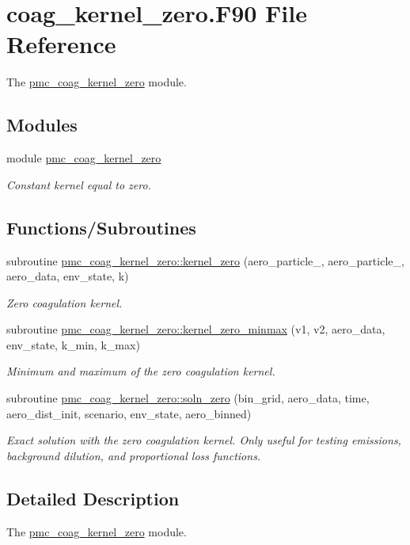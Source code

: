 \hypertarget{coag__kernel__zero_8_f90}{}\section{coag\+\_\+kernel\+\_\+zero.\+F90 File Reference}
\label{coag__kernel__zero_8_f90}


The \mbox{\hyperlink{namespacepmc__coag__kernel__zero}{pmc\+\_\+coag\+\_\+kernel\+\_\+zero}} module.  


\subsection*{Modules}
\begin{DoxyCompactItemize}
\item 
module \mbox{\hyperlink{namespacepmc__coag__kernel__zero}{pmc\+\_\+coag\+\_\+kernel\+\_\+zero}}
\begin{DoxyCompactList}\small\item\em Constant kernel equal to zero. \end{DoxyCompactList}\end{DoxyCompactItemize}
\subsection*{Functions/\+Subroutines}
\begin{DoxyCompactItemize}
\item 
subroutine \mbox{\hyperlink{namespacepmc__coag__kernel__zero_ac45443a66ef9e7a0dd042ca4e6d2b66d}{pmc\+\_\+coag\+\_\+kernel\+\_\+zero\+::kernel\+\_\+zero}} (aero\+\_\+particle\+\_, aero\+\_\+particle\+\_, aero\+\_\+data, env\+\_\+state, k)
\begin{DoxyCompactList}\small\item\em Zero coagulation kernel. \end{DoxyCompactList}\item 
subroutine \mbox{\hyperlink{namespacepmc__coag__kernel__zero_ac1a17d46d81c003f44f93eafe195d3c5}{pmc\+\_\+coag\+\_\+kernel\+\_\+zero\+::kernel\+\_\+zero\+\_\+minmax}} (v1, v2, aero\+\_\+data, env\+\_\+state, k\+\_\+min, k\+\_\+max)
\begin{DoxyCompactList}\small\item\em Minimum and maximum of the zero coagulation kernel. \end{DoxyCompactList}\item 
subroutine \mbox{\hyperlink{namespacepmc__coag__kernel__zero_af04cc325508f88c203c444b94f09cc51}{pmc\+\_\+coag\+\_\+kernel\+\_\+zero\+::soln\+\_\+zero}} (bin\+\_\+grid, aero\+\_\+data, time, aero\+\_\+dist\+\_\+init, scenario, env\+\_\+state, aero\+\_\+binned)
\begin{DoxyCompactList}\small\item\em Exact solution with the zero coagulation kernel. Only useful for testing emissions, background dilution, and proportional loss functions. \end{DoxyCompactList}\end{DoxyCompactItemize}


\subsection{Detailed Description}
The \mbox{\hyperlink{namespacepmc__coag__kernel__zero}{pmc\+\_\+coag\+\_\+kernel\+\_\+zero}} module. 

